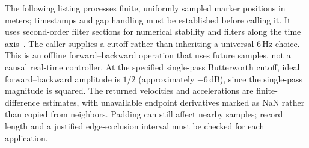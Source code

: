 The following listing processes finite, uniformly sampled marker positions in meters; timestamps and gap handling must be established before calling it.
It uses second-order filter sections for numerical stability and filters along the time axis~\cite{SciPyButterExperimental,SciPySosFiltFiltExperimental}.
The caller supplies a cutoff rather than inheriting a universal 6\,Hz choice.
This is an offline forward--backward operation that uses future samples, not a causal real-time controller.
At the specified single-pass Butterworth cutoff, ideal forward--backward amplitude is $1/2$ (approximately $-6$\,dB), since the single-pass magnitude is squared.
The returned velocities and accelerations are finite-difference estimates, with unavailable endpoint derivatives marked as NaN rather than copied from neighbors.
Padding can still affect nearby samples; record length and a justified edge-exclusion interval must be checked for each application.

